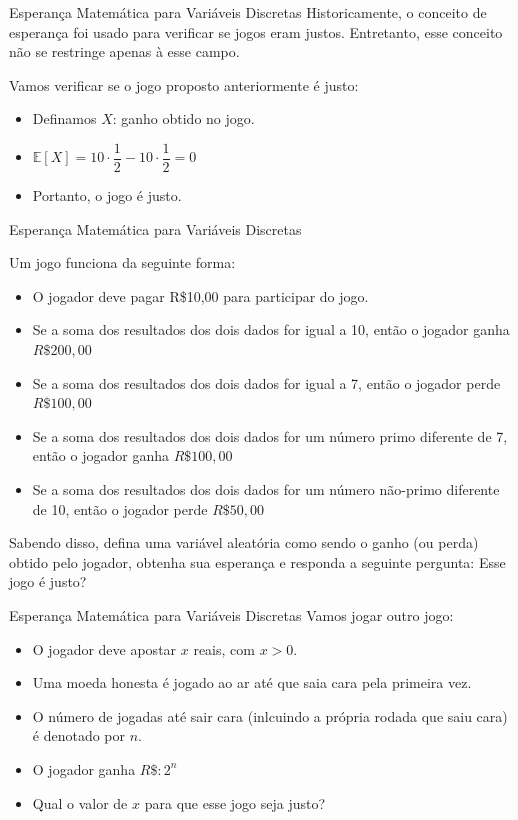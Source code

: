\begin{frame}{Esperança Matemática para Variáveis Discretas }
    Historicamente, o conceito de esperança foi usado para verificar se jogos eram justos. Entretanto, esse conceito não se restringe apenas à esse campo. 

    \pause

    Vamos verificar se o jogo proposto anteriormente é justo:
    \begin{itemize}
        \item Definamos $X$: ganho obtido no jogo. 
        \pause
        \item $\mathds{E}[X] = 10 \cdot \dfrac{1}{2} -10 \cdot \dfrac{1}{2} = 0 $
        \pause
        \item Portanto, o jogo é justo. 
    \end{itemize}
\end{frame}

\begin{frame}{Esperança Matemática para Variáveis Discretas }
\begin{exemplo}
Um jogo funciona da seguinte forma:
    \begin{itemize}
        \item O jogador deve pagar R\$10,00 para participar do jogo.
        \item Se a soma dos resultados dos dois dados for igual a 10, então o jogador ganha $R\$200,00$
        \item Se a soma dos resultados dos dois dados for igual a 7, então o jogador perde $R\$100,00$
        \item Se a soma dos resultados dos dois dados for um número primo diferente de 7, então o jogador ganha $R\$100,00$
        \item Se a soma dos resultados dos dois dados for um número não-primo diferente de 10, então o jogador perde  $R\$50,00$
    \end{itemize}
    Sabendo disso, defina uma variável aleatória como sendo o ganho (ou perda) obtido pelo jogador, obtenha sua esperança e responda a seguinte pergunta: Esse jogo é justo?
\end{exemplo}    
\end{frame}

\begin{frame}{Esperança Matemática para Variáveis Discretas }
    Vamos jogar outro jogo:
    \begin{itemize}
        \item O jogador deve apostar $x$ reais, com $x > 0$.
        \pause
        \item Uma moeda honesta é jogado ao ar até que saia cara pela primeira vez.
        \pause
        \item O número de jogadas até sair cara (inlcuindo a própria rodada que saiu cara) é denotado por $n$.
        \pause
        \item O jogador ganha $R\$: 2^n$
        \pause
        \item Qual o valor de $x$ para que esse jogo seja justo?
    \end{itemize}
\end{frame}


